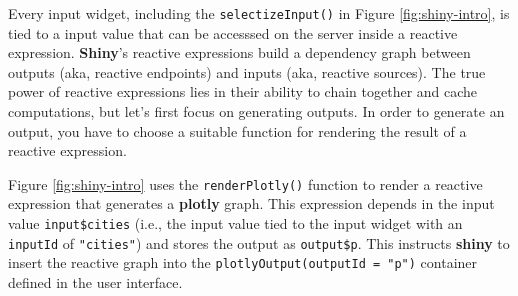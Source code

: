 \documentclass[
  12pt,
]{krantz}
\newenvironment{Shaded}{\begin{snugshade}}{\end{snugshade}}
\newcommand{\ControlFlowTok}[1]{\textcolor[rgb]{0.13,0.29,0.53}{\textbf{#1}}}
\newcommand{\DataTypeTok}[1]{\textcolor[rgb]{0.13,0.29,0.53}{#1}}
\newcommand{\KeywordTok}[1]{\textcolor[rgb]{0.13,0.29,0.53}{\textbf{#1}}}
\newcommand{\NormalTok}[1]{#1}
\newcommand{\OperatorTok}[1]{\textcolor[rgb]{0.81,0.36,0.00}{\textbf{#1}}}
\newcommand{\OtherTok}[1]{\textcolor[rgb]{0.56,0.35,0.01}{#1}}
\newcommand{\StringTok}[1]{\textcolor[rgb]{0.31,0.60,0.02}{#1}}
\begin{document}
Every input widget, including the \texttt{selectizeInput()} in Figure \ref{fig:shiny-intro}, is tied to a input value that can be accesssed on the server inside a reactive expression. \textbf{Shiny}'s reactive expressions build a dependency graph between outputs (aka, reactive endpoints) and inputs (aka, reactive sources). The true power of reactive expressions lies in their ability to chain together and cache computations, but let's first focus on generating outputs. In order to generate an output, you have to choose a suitable function for rendering the result of a reactive expression.

Figure \ref{fig:shiny-intro} uses the \texttt{renderPlotly()} function to render a reactive expression that generates a \textbf{plotly} graph. This expression depends in the input value \texttt{input\$cities} (i.e., the input value tied to the input widget with an \texttt{inputId} of \texttt{"cities"}) and stores the output as \texttt{output\$p}. This instructs \textbf{shiny} to insert the reactive graph into the \texttt{plotlyOutput(outputId\ =\ "p")} container defined in the user interface.

\begin{Shaded}
\end{Shaded}
\end{document}
